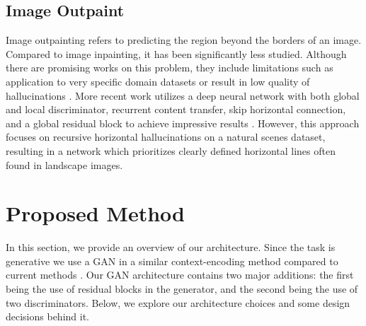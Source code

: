 \documentclass{article}
\begin{document}
\subsection{Image Outpaint}
Image outpainting refers to predicting the region beyond the borders of an image. Compared to image inpainting, it has been significantly less studied. Although there are promising works on this problem, they include limitations such as application to very specific domain datasets or result in low quality of hallucinations \citep{van_hoorick_image_2020}\citep{wang_wide-context_2019}. More recent work utilizes a deep neural network with both global and local discriminator, recurrent content transfer, skip horizontal connection, and a global residual block to achieve impressive results \citep{yang_very_2019}. However, this approach focuses  on recursive horizontal hallucinations on a natural scenes dataset, resulting in a network which prioritizes clearly defined horizontal lines often found in landscape images.

\section{Proposed Method}
In this section, we provide an overview of our architecture. Since the task is generative we use a GAN in a similar context-encoding method compared to current methods \citep{van_hoorick_image_2020}\citep{pathak_context_2016}. Our GAN architecture contains two major additions: the first being the use of residual blocks in the generator, and the second being the use of two discriminators. Below, we explore our architecture choices and some design decisions behind it.
\end{document}
